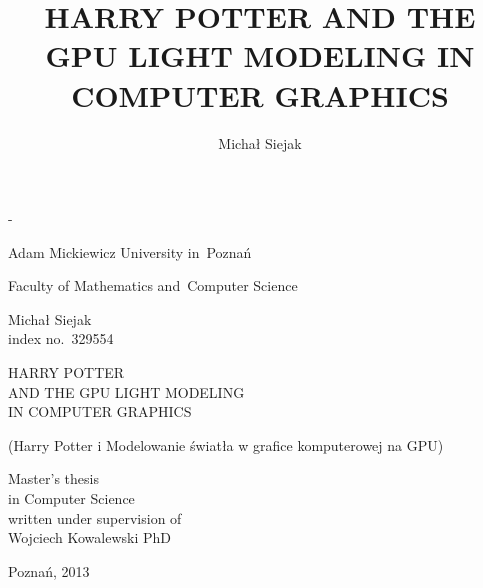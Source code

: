 \documentclass[oneside,openright,a4paper,12pt]{memoir}
\theoremstyle{definition}
\begin{document}
\title{HARRY POTTER AND THE GPU LIGHT MODELING IN COMPUTER GRAPHICS}
\author{Michał Siejak}

\frontmatter
{}

\begin{titlingpage}
\calccentering{\unitlength}
\begin{adjustwidth*}{\unitlength}{-\unitlength}
\begin{center}
  
 \begin{LARGE}
   Adam Mickiewicz University in~Poznań\\
   \begin{Large}
     Faculty of Mathematics and~Computer Science\\
   \end{Large}
   \vspace{1.5cm}
   \begin{huge}
     Michał Siejak\\
     \small{index no.~329554}\\
   \end{huge}
   \vspace{1.5cm}
   \begin{Huge}
     HARRY POTTER\\ AND THE GPU LIGHT MODELING\\ IN COMPUTER GRAPHICS\\
   \end{Huge}
   \vspace{-0.3cm}
   \begin{footnotesize}
     (Harry Potter i Modelowanie światła w grafice komputerowej na GPU)
   \end{footnotesize}
   \vspace{2.0cm}
    \begin{flushleft}
      \hsize
      \large
      Master's thesis\\
      in Computer Science\\
      written under supervision of\\
      Wojciech Kowalewski PhD\\
    \end{flushleft}
    \vfill
    Poznań, 2013
 \end{LARGE}
\end{center}
\end{adjustwidth*}
\end{titlingpage}

\setcounter{page}{2}
\end{document}
